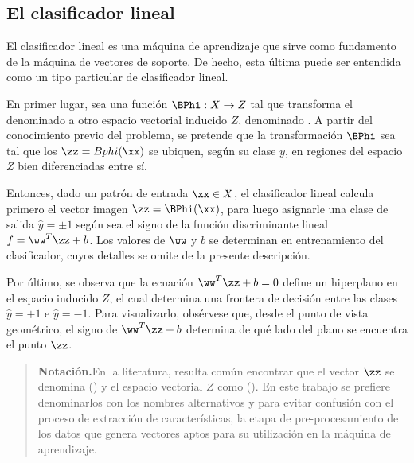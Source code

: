 %
%
\subsection{El clasificador lineal}
%
El clasificador lineal es una máquina de aprendizaje \cite{nilsson}
que sirve como fundamento de la máquina de vectores de soporte. De
hecho, esta última puede ser entendida como un tipo particular de
clasificador lineal.

En primer lugar, sea una función $\BPhi:X\rightarrow{}Z$ tal que
transforma el denominado  a otro espacio
vectorial inducido $Z$, denominado .  A partir del
conocimiento previo del problema, se pretende que la transformación
$\BPhi$ sea tal que los  $\zz=Bphi(\xx)$ se
ubiquen, según su clase $y$, en regiones del espacio $Z$ bien
diferenciadas entre sí.

Entonces, dado un patrón de entrada $\xx\in{}X$, el clasificador
lineal calcula primero el vector imagen $\zz=\BPhi(\xx)$, para luego
asignarle una clase de salida $\hat{y}=\pm{}1$ según sea el signo de
la función discriminante lineal $f=\ww^T\zz+b$.  Los valores de $\ww$
y $b$ se determinan en entrenamiento del clasificador, cuyos detalles
se omite de la presente descripción.

Por último, se observa que la ecuación $\ww^T\zz+b=0$ define un
hiperplano en el espacio inducido $Z$, el cual determina una frontera
de decisión entre las clases $\hat{y}=+1$ e $\hat{y}=-1$. Para
visualizarlo, obsérvese que, desde el punto de vista geométrico, el
signo de $\ww^T\zz+b$ determina de qué lado del plano se encuentra el
punto $\zz$.

%
\begin{quote}
  {\bfseries Notación.}\quad{}En la literatura, resulta común
  encontrar que el vector $\zz$ se denomina  () y el espacio vectorial $Z$
  como  ().  En
  este trabajo se prefiere denominarlos con los nombres alternativos
   y  para evitar
  confusión con el proceso de extracción de características, la etapa
  de pre-procesamiento de los datos que genera vectores aptos para su
  utilización en la máquina de aprendizaje.
\end{quote}
%
